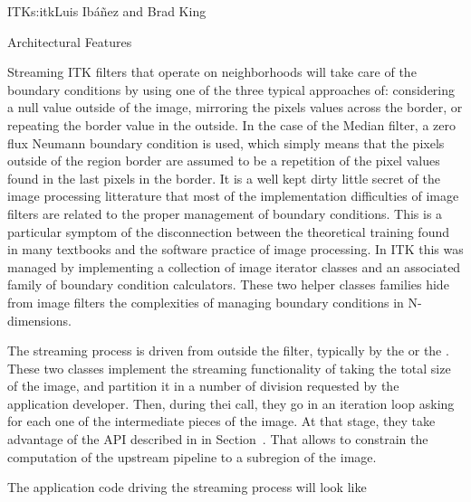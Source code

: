 \begin{aosachapter}{ITK}{s:itk}{Luis Ib\'{a}\~{n}ez and Brad King}
\begin{aosasect1}{Architectural Features}
\begin{aosasect2}{Streaming}
ITK filters that operate on neighborhoods will take care of the boundary
conditions by using one of the three typical approaches of: considering a null
value outside of the image, mirroring the pixels values across the border, or
repeating the border value in the outside. In the case of the Median filter, a
zero flux Neumann boundary condition is used, which simply means that the
pixels outside of the region border are assumed to be a repetition of the pixel
values found in the last pixels in the border. It is a well kept dirty little
secret of the image processing litterature that most of the implementation
difficulties of image filters are related to the proper management of boundary
conditions. This is a particular symptom of the disconnection between the
theoretical training found in many textbooks and the software practice of image
processing.  In ITK this was managed by implementing a collection of image
iterator classes and an associated family of boundary condition calculators.
These two helper classes families hide from image filters the
complexities of managing boundary conditions in N-dimensions.

The streaming process is driven from outside the filter, typically by the
 or the . These two classes
implement the streaming functionality of taking the total size of the image,
and partition it in a number of division requested by the application
developer.  Then, during thei  call, they go in an iteration
loop asking for each one of the intermediate pieces of the image. At that
stage, they take advantage of the  API described in
 in
Section~. That allows to constrain the
computation of the upstream pipeline to a subregion of the image.

The application code driving the streaming process will look like

\begin{aosaitemize}
\item {}
\item {}
\item {}
\item {}
\item {}
\item {}
\end{aosaitemize}


\end{aosasect2}
\end{aosasect1}
\end{aosachapter}
